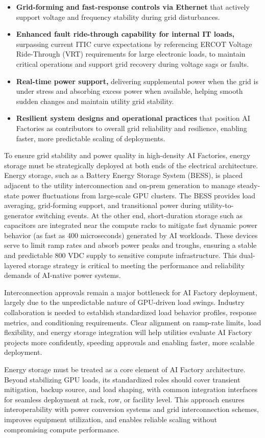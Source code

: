\begin{itemize}
\item \textbf{Grid-forming and fast-response controls via Ethernet} that actively support voltage and frequency stability during grid disturbances.

\item \textbf{Enhanced fault ride-through capability for internal IT loads,} surpassing current ITIC curve expectations by referencing ERCOT Voltage Ride-Through (VRT) requirements for large electronic loads, to maintain critical operations and support grid recovery during voltage sags or faults.

\item \textbf{Real-time power support,} delivering supplemental power when the grid is under stress and absorbing excess power when available, helping smooth sudden changes and maintain utility grid stability.

\item \textbf{Resilient system designs and operational practices} that position AI Factories as contributors to overall grid reliability and resilience, enabling faster, more predictable scaling of deployments.
\end{itemize}

To ensure grid stability and power quality in high-density AI Factories, energy storage must be strategically deployed at both ends of the electrical architecture. Energy storage, such as a Battery Energy Storage System (BESS), is placed adjacent to the utility interconnection and on-prem generation to manage steady-state power fluctuations from large-scale GPU clusters. The BESS provides load averaging, grid-forming support, and transitional power during utility-to-generator switching events. At the other end, short-duration storage such as capacitors are integrated near the compute racks to mitigate fast dynamic power behavior (as fast as 400 microseconds) generated by AI workloads. These devices serve to limit ramp rates and absorb power peaks and troughs, ensuring a stable and predictable 800 VDC supply to sensitive compute infrastructure. This dual-layered storage strategy is critical to meeting the performance and reliability demands of AI-native power systems.

Interconnection approvals remain a major bottleneck for AI Factory deployment, largely due to the unpredictable nature of GPU-driven load swings. Industry collaboration is needed to establish standardized load behavior profiles, response metrics, and conditioning requirements. Clear alignment on ramp-rate limits, load flexibility, and energy storage integration will help utilities evaluate AI Factory projects more confidently, speeding approvals and enabling faster, more scalable deployment.

Energy storage must be treated as a core element of AI Factory architecture. Beyond stabilizing GPU loads, its standardized roles should cover transient mitigation, backup source, and load shaping, with common integration interfaces for seamless deployment at rack, row, or facility level. This approach ensures interoperability with power conversion systems and grid interconnection schemes, improves equipment utilization, and enables reliable scaling without compromising compute performance.
